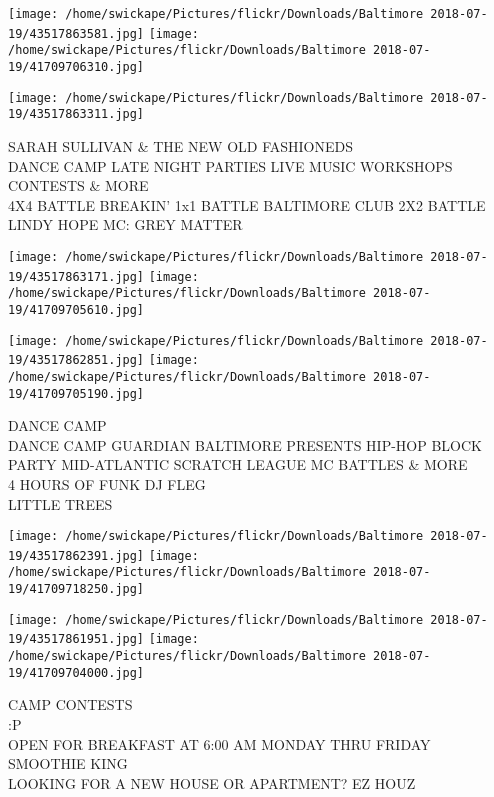 \documentclass[10pt,letterpaper]{article}
\begin{document}
\texttt{[image: /home/swickape/Pictures/flickr/Downloads/Baltimore 2018-07-19/43517863581.jpg]}
\texttt{[image: /home/swickape/Pictures/flickr/Downloads/Baltimore 2018-07-19/41709706310.jpg]}

\vspace{0.25in}
\texttt{[image: /home/swickape/Pictures/flickr/Downloads/Baltimore 2018-07-19/43517863311.jpg]}

SARAH SULLIVAN \& THE NEW OLD FASHIONEDS\\
DANCE CAMP LATE NIGHT PARTIES LIVE MUSIC WORKSHOPS CONTESTS \& MORE\\
4X4 BATTLE BREAKIN' 1x1 BATTLE BALTIMORE CLUB 2X2 BATTLE LINDY HOPE MC: GREY MATTER\\
\pagebreak

\texttt{[image: /home/swickape/Pictures/flickr/Downloads/Baltimore 2018-07-19/43517863171.jpg]}
\texttt{[image: /home/swickape/Pictures/flickr/Downloads/Baltimore 2018-07-19/41709705610.jpg]}

\texttt{[image: /home/swickape/Pictures/flickr/Downloads/Baltimore 2018-07-19/43517862851.jpg]}
\texttt{[image: /home/swickape/Pictures/flickr/Downloads/Baltimore 2018-07-19/41709705190.jpg]}

DANCE CAMP\\
DANCE CAMP GUARDIAN BALTIMORE PRESENTS HIP{-}HOP BLOCK PARTY MID{-}ATLANTIC SCRATCH LEAGUE MC BATTLES \& MORE\\
4 HOURS OF FUNK DJ FLEG\\
LITTLE TREES\\
\pagebreak

\texttt{[image: /home/swickape/Pictures/flickr/Downloads/Baltimore 2018-07-19/43517862391.jpg]}
\texttt{[image: /home/swickape/Pictures/flickr/Downloads/Baltimore 2018-07-19/41709718250.jpg]}

\texttt{[image: /home/swickape/Pictures/flickr/Downloads/Baltimore 2018-07-19/43517861951.jpg]}
\texttt{[image: /home/swickape/Pictures/flickr/Downloads/Baltimore 2018-07-19/41709704000.jpg]}

CAMP CONTESTS\\
:P\\
OPEN FOR BREAKFAST AT 6:00 AM MONDAY THRU FRIDAY SMOOTHIE KING\\
LOOKING FOR A NEW HOUSE OR APARTMENT?  EZ HOUZ\\
\pagebreak
\end{document}
